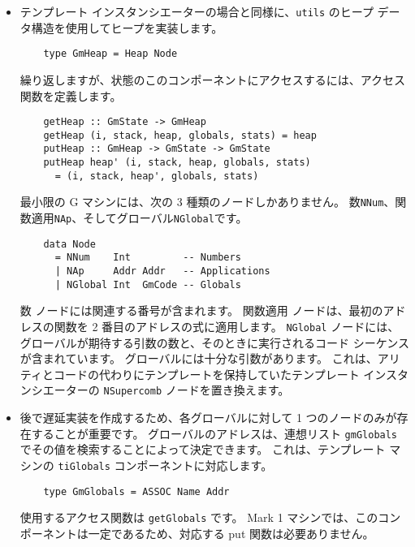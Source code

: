 \documentclass{jarticle}
\begin{document}
\begin{itemize}
	\item テンプレート インスタンシエーターの場合と同様に、\texttt{utils} のヒープ データ構造を使用してヒープを実装します。

	      \begin{verbatim}
    type GmHeap = Heap Node
  \end{verbatim}

	      繰り返しますが、状態のこのコンポーネントにアクセスするには、アクセス関数を定義します。

	      \begin{verbatim}
    getHeap :: GmState -> GmHeap
    getHeap (i, stack, heap, globals, stats) = heap
    putHeap :: GmHeap -> GmState -> GmState
    putHeap heap' (i, stack, heap, globals, stats)
      = (i, stack, heap', globals, stats)
  \end{verbatim}

	      最小限の G マシンには、次の 3 種類のノードしかありません。
	      数\texttt{NNum}、関数適用\texttt{NAp}、そしてグローバル\texttt{NGlobal}です。

	      \begin{verbatim}
    data Node
      = NNum    Int         -- Numbers
      | NAp     Addr Addr   -- Applications
      | NGlobal Int  GmCode -- Globals
  \end{verbatim}

	      数 ノードには関連する番号が含まれます。
	      関数適用 ノードは、最初のアドレスの関数を 2 番目のアドレスの式に適用します。
	      \texttt{NGlobal} ノードには、グローバルが期待する引数の数と、そのときに実行されるコード シーケンスが含まれています。
	      グローバルには十分な引数があります。
	      これは、アリティとコードの代わりにテンプレートを保持していたテンプレート インスタンシエーターの \texttt{NSupercomb} ノードを置き換えます。

	\item 後で遅延実装を作成するため、各グローバルに対して 1 つのノードのみが存在することが重要です。
	      グローバルのアドレスは、連想リスト \texttt{gmGlobals} でその値を検索することによって決定できます。
	      これは、テンプレート マシンの \texttt{tiGlobals} コンポーネントに対応します。

	      \begin{verbatim}
    type GmGlobals = ASSOC Name Addr
  \end{verbatim}

	      使用するアクセス関数は \texttt{getGlobals} です。
	      Mark 1 マシンでは、このコンポーネントは一定であるため、対応する put 関数は必要ありません。


\end{itemize}
\end{document}
